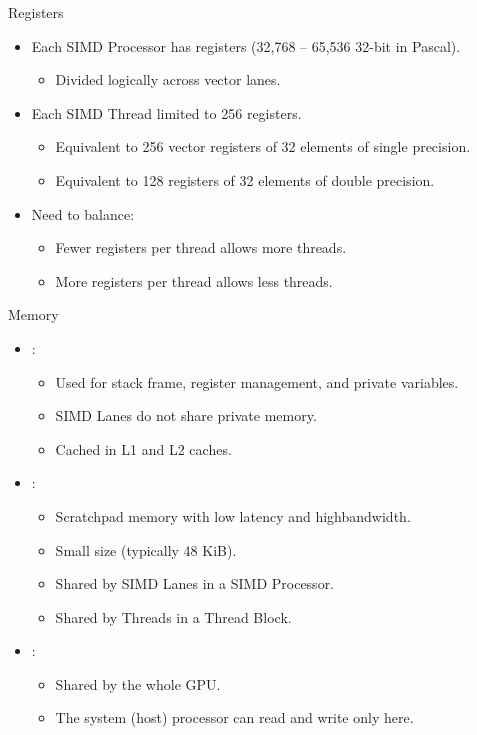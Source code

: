 \begin{frame}[t]{Registers}
\begin{itemize}
  \item Each SIMD Processor has registers (32,768 -- 65,536 32-bit in Pascal).
    \begin{itemize}
      \item Divided logically across vector lanes.
    \end{itemize}

  \item Each SIMD Thread limited to 256 registers.
    \begin{itemize}
      \item Equivalent to 256 vector registers of 32 elements of single precision.
      \item Equivalent to 128 registers of 32 elements of double precision.
    \end{itemize}

  \item Need to balance:
    \begin{itemize}
      \item Fewer registers per thread allows more threads.
      \item More registers per thread allows less threads.
    \end{itemize}
\end{itemize}
\end{frame}

\begin{frame}[t]{Memory}
\begin{itemize}
  \item {}:
    \begin{itemize}
      \item Used for stack frame, register management, and private variables.
      \item SIMD Lanes do not share private memory.
      \item Cached in L1 and L2 caches.
    \end{itemize}

  \item {}:
    \begin{itemize}
      \item Scratchpad memory with low latency and highbandwidth.
      \item Small size (typically 48 KiB).
      \item Shared by SIMD Lanes in a SIMD Processor.
      \item Shared by Threads in a Thread Block.
    \end{itemize}

  \item {}:
    \begin{itemize}
      \item Shared by the whole GPU.
      \item The system (host) processor can read and write only here.
    \end{itemize}
\end{itemize}
\end{frame}
